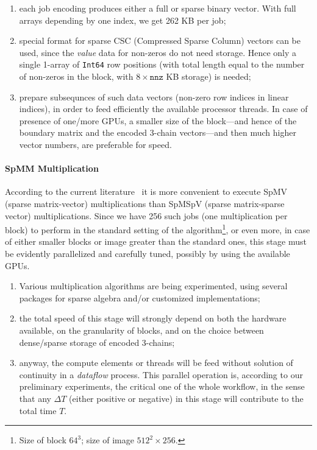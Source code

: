 \begin{enumerate}

\item each job encoding produces either a full or sparse binary vector. With full arrays depending by one index, we get 262 KB per job;

\item special format for sparse CSC (Compressed Sparse Column) vectors can be used, since the \emph{value} data for non-zeros do not need storage. Hence only a single 1-array of \texttt{Int64} row positions (with total length equal to the number of non-zeros in the block, with $8\times\mathtt{nnz}$ KB storage) is needed;

\item prepare subsequnces of such data vectors (non-zero row indices in linear indices), in order to feed efficiently the available processor threads.
In case of presence of one/more GPUs, a smaller size of the block---and hence of the boundary matrix and the encoded 3-chain vectors---and then much higher vector numbers, are preferable for speed.


\end{enumerate}

\paragraph{SpMM Multiplication} 
According to the current literature~\cite{} it is more convenient to execute SpMV (sparse matrix-vector) multiplications than SpMSpV (sparse matrix-sparse vector) multiplications. Since we have 256 such jobs (one multiplication per block) to perform in the standard setting of the algorithm\footnote{
Size of block $64^3$; size of image $512^2\times 256$.
}, or even more, in case of either smaller blocks or image greater than the standard ones, this stage must be evidently parallelized and carefully tuned, possibly by using the available GPUs.
\begin{enumerate}

\item Various multiplication algorithms are being experimented, using several packages for sparse algebra and/or customized implementations;

\item the total speed of this stage will strongly depend on both the hardware available, on the granularity of blocks, and on the choice between dense/sparse storage of encoded 3-chains;

\item anyway, the compute elements or threads will be feed without solution of continuity in a \emph{dataflow} process. This parallel operation is, according to our preliminary experiments, the critical one of the whole workflow, in the sense that any $\Delta T$ (either positive or negative) in this stage will contribute to the total time $T$.

\end{enumerate}

